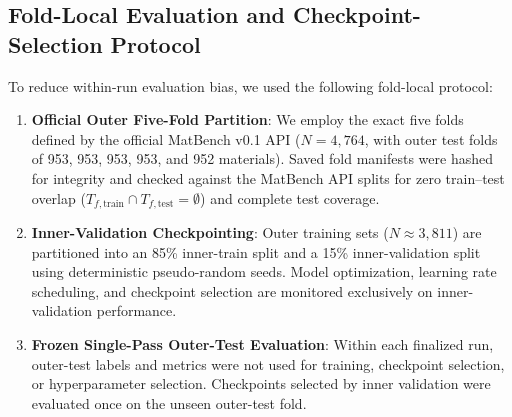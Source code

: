 \documentclass[final,3p,times]{elsarticle}
\begin{document}
\subsection{Fold-Local Evaluation and Checkpoint-Selection Protocol}
To reduce within-run evaluation bias, we used the following fold-local protocol:
\begin{enumerate}
    \item \textbf{Official Outer Five-Fold Partition}: We employ the exact five folds defined by the official MatBench v0.1 API ($N = 4{,}764$, with outer test folds of 953, 953, 953, 953, and 952 materials). Saved fold manifests were hashed for integrity and checked against the MatBench API splits for zero train--test overlap ($T_{f,\mathrm{train}} \cap T_{f,\mathrm{test}} = \emptyset$) and complete test coverage.
    \item \textbf{Inner-Validation Checkpointing}: Outer training sets ($N \approx 3,811$) are partitioned into an 85\% inner-train split and a 15\% inner-validation split using deterministic pseudo-random seeds. Model optimization, learning rate scheduling, and checkpoint selection are monitored exclusively on inner-validation performance.
    \item \textbf{Frozen Single-Pass Outer-Test Evaluation}: Within each finalized run, outer-test labels and metrics were not used for training, checkpoint selection, or hyperparameter selection. Checkpoints selected by inner validation were evaluated once on the unseen outer-test fold.
\end{enumerate}
\end{document}
